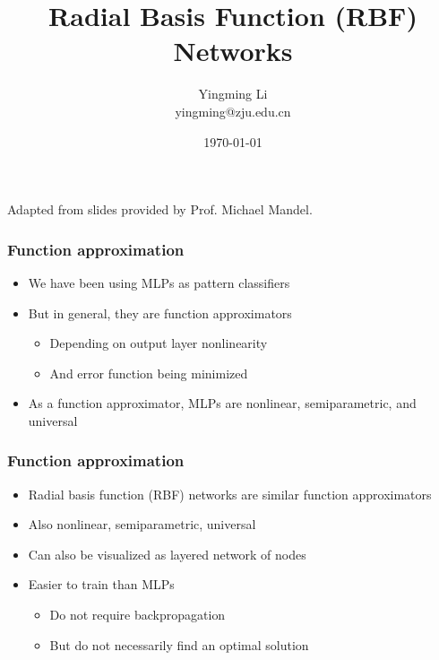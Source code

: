 \documentclass[12pt,notes,mathserif]{beamer}
\title{Radial Basis Function (RBF) Networks}
\author[YingmingLi]{Yingming Li \\ yingming@zju.edu.cn}
\institute[DSERC, ZJU]{Data Science \& Engineering Research Center, ZJU}
\date[\today]{\today}
\begin{document}

\begin{frame}[c]
	\titlepage
	\begin{center}
		Adapted from slides provided by Prof.  Michael Mandel.
	\end{center}
\end{frame}

\begin{frame}[c]
	\frametitle{Function approximation}
	\begin{itemize}
		\item We have been using MLPs as pattern classifiers
		\item But in general, they are function approximators
		      \begin{itemize}
			      \item Depending on output layer nonlinearity
			      \item And error function being minimized
		      \end{itemize}
		\item As a function approximator, MLPs are nonlinear, semiparametric, and universal
	\end{itemize}
\end{frame}
\begin{frame}[c]
	\frametitle{Function approximation}
	\begin{itemize}
		\item  Radial basis function (RBF) networks are similar function approximators
		\item Also nonlinear, semiparametric, universal
		\item Can also be visualized as layered network of nodes
		\item Easier to train than MLPs
		      \begin{itemize}
			      \item Do not require backpropagation
			      \item But do not necessarily find an optimal solution
		      \end{itemize}
	\end{itemize}
\end{frame}
\end{document}
